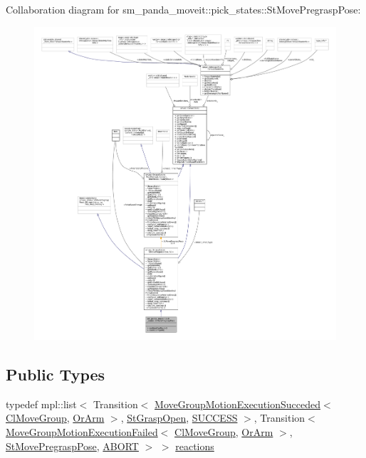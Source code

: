 Collaboration diagram for sm\+\_\+panda\+\_\+moveit\+:\+:pick\+\_\+states\+:\+:St\+Move\+Pregrasp\+Pose\+:
\nopagebreak
\begin{figure}[H]
\begin{center}
\leavevmode
\includegraphics[width=350pt]{structsm__panda__moveit_1_1pick__states_1_1StMovePregraspPose__coll__graph}
\end{center}
\end{figure}
\subsection*{Public Types}
\begin{DoxyCompactItemize}
\item 
typedef mpl\+::list$<$ Transition$<$ \hyperlink{structmoveit__z__client_1_1MoveGroupMotionExecutionSucceded}{Move\+Group\+Motion\+Execution\+Succeded}$<$ \hyperlink{classmoveit__z__client_1_1ClMoveGroup}{Cl\+Move\+Group}, \hyperlink{classsm__panda__moveit_1_1OrArm}{Or\+Arm} $>$, \hyperlink{structsm__panda__moveit_1_1pick__states_1_1StGraspOpen}{St\+Grasp\+Open}, \hyperlink{classSUCCESS}{S\+U\+C\+C\+E\+SS} $>$, Transition$<$ \hyperlink{structmoveit__z__client_1_1MoveGroupMotionExecutionFailed}{Move\+Group\+Motion\+Execution\+Failed}$<$ \hyperlink{classmoveit__z__client_1_1ClMoveGroup}{Cl\+Move\+Group}, \hyperlink{classsm__panda__moveit_1_1OrArm}{Or\+Arm} $>$, \hyperlink{structsm__panda__moveit_1_1pick__states_1_1StMovePregraspPose}{St\+Move\+Pregrasp\+Pose}, \hyperlink{classABORT}{A\+B\+O\+RT} $>$ $>$ \hyperlink{structsm__panda__moveit_1_1pick__states_1_1StMovePregraspPose_a1189a52a5e39d3ca3db3e754597068a7}{reactions}
\end{DoxyCompactItemize}
